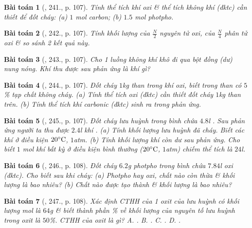 \documentclass{article}
\newtheorem{baitoan}{Bài toán}
\begin{document}
\begin{baitoan}[\cite{An_400_BT_Hoa_Hoc_8_2020}, 241., p. 107]
	Tính thể tích khí oxi \& thể tích không khí (đktc) cần thiết để đốt cháy: (a) $1$ \emph{mol} carbon; (b) $1.5$ \emph{mol} photpho.
\end{baitoan}

\begin{baitoan}[\cite{An_400_BT_Hoa_Hoc_8_2020}, 242., p. 107]
	Tính khối lượng của $\frac{N}{2}$ nguyên tử oxi, của $\frac{N}{4}$ phân tử oxi \& so sánh 2 kết quả này.
\end{baitoan}

\begin{baitoan}[\cite{An_400_BT_Hoa_Hoc_8_2020}, 243., p. 107]
	Cho 1 luồng không khí khô đi qua bột đồng (dư) nung nóng. Khí thu được sau phản ứng là khí gì?
\end{baitoan}

\begin{baitoan}[\cite{An_400_BT_Hoa_Hoc_8_2020}, 244., p. 107]
	Đốt cháy $1$\emph{kg} than trong khí oxi, biết trong than có $5$\% tạp chất không cháy. (a) Tính thể tích oxi (đktc) cần thiết đốt cháy $1$\emph{kg} than trên. (b) Tính thể tích khí carbonic (đktc) sinh ra trong phản ứng.
\end{baitoan}

\begin{baitoan}[\cite{An_400_BT_Hoa_Hoc_8_2020}, 245., p. 107]
	Đốt cháy lưu huỳnh trong bình chứa $4.8$\emph{l }. Sau phản ứng người ta thu được $2.4$\emph{l} khí \emph{}. (a) Tính khối lượng lưu huỳnh đã cháy. Biết các khí ở điều kiện $20^\circ{\rm C}$, $1$\emph{atm}. (b) Tính khối lượng khí \emph{} còn dư sau phản ứng. Cho biết $1$ \emph{mol} khí bất kỳ ở điều kiện bình thường ($20^\circ{\rm C}$, $1$\emph{atm}) chiếm thể tích là $24$\emph{l}.
\end{baitoan}

\begin{baitoan}[\cite{An_400_BT_Hoa_Hoc_8_2020}, 246., p. 108]
	Đốt cháy $6.2$\emph{g} photpho trong bình chứa $7.84$\emph{l} oxi (đktc). Cho biết sau khi cháy: (a) Photpho hay oxi, chất nào còn thừa \& khối lượng là bao nhiêu? (b) Chất nào được tạo thành \& khối lượng là bao nhiêu?
\end{baitoan}

\begin{baitoan}[\cite{An_400_BT_Hoa_Hoc_8_2020}, 247., p. 108]
	Xác định CTHH của 1 oxit của lưu huỳnh có khối lượng mol là $64$\emph{g} \& biết thành phần \% về khối lượng của nguyên tố lưu huỳnh trong oxit là $50$\%. CTHH của oxit là gì? {\sf A.} \emph{}. {\sf B.} \emph{}. {\sf C.} \emph{}. {\sf D.} \emph{}.
\end{baitoan}
\end{document}
